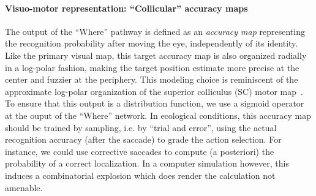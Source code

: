 \paragraph{Visuo-motor representation: ``Collicular'' accuracy maps}

The output of the ``Where'' pathway is defined as an \emph{accuracy map} representing the recognition probability after moving the eye, independently of its identity. Like the primary visual map, this target accuracy map is also organized radially in a log-polar fashion, making the target position estimate more precise at the center and fuzzier at the periphery. This modeling choice is reminiscent of the approximate log-polar organization of the superior colliculus (SC) motor map~\cite{sparks1987sensory}. To ensure that this output is a distribution function, we use a sigmoid operator at the ouput of the ``Where'' network. In ecological conditions, this accuracy map should be trained by sampling, i.e. by ``trial and error'', using the actual recognition accuracy (after the saccade) to grade the action selection. For instance, we could use corrective saccades to compute (a posteriori) the probability of a correct localization. In a computer simulation however, this induces a combinatorial explosion which does render the calculation not amenable.

